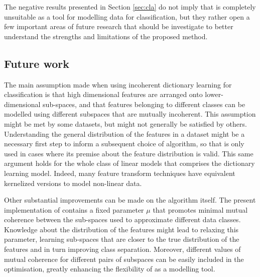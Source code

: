 \documentclass{article}
\def \coherence{\mu} 		%
\begin{document}
The negative results presented in Section \ref{sec:cla} do not imply that  is completely unsuitable as a tool for modelling data for classification, but they rather open a few important areas of future research that should be investigate to better understand the strengths and limitations of the proposed method.

\subsection{Future work}
The main assumption made when using incoherent dictionary learning for classification is that high dimensional features are arranged onto lower-dimensional sub-spaces, and that features belonging to different classes can be modelled using different subspaces that are mutually incoherent. This assumption might be met by some datasets, but might not generally be satisfied by others. Understanding the general distribution of the features in a  dataset might be a necessary first step to inform a subsequent choice of algorithm, so that  is only used in cases where its premise about the feature distribution is valid. This same argument holds for the whole class of linear models that comprises the dictionary learning model. Indeed, many feature transform techniques have equivalent kernelized versions to model non-linear data.

Other substantial improvements can be made on the algorithm itself. The present implementation of  contains a fixed parameter $\coherence$ that promotes minimal mutual coherence between the sub-spaces used to approximate different data classes. Knowledge about the distribution of the features might lead to relaxing this parameter, learning sub-spaces that are closer to the true distribution of the features and in turn improving class separation. Moreover, different values of mutual coherence for different pairs of subspaces can be easily included in the optimisation, greatly enhancing the flexibility of  as a modelling tool.



\end{document}
